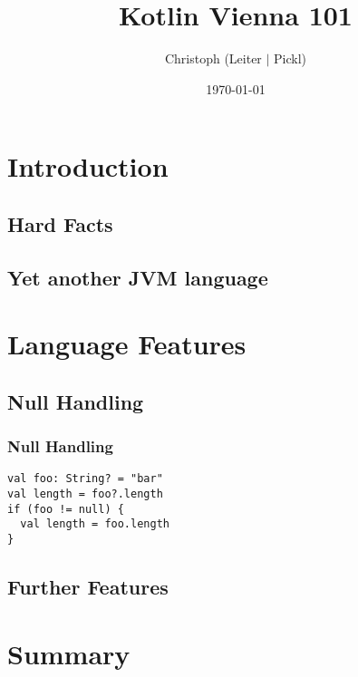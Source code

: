 \documentclass{beamer}
\begin{document}
\title{Kotlin Vienna 101}   
\author{Christoph (Leiter $\vert$ Pickl)} 
\date{\today} 


\frame{\titlepage} 



\section{Introduction}

\subsection{Hard Facts}

\subsection{Yet another JVM language}



\section{Language Features}
\subsection{Null Handling}
\begin{frame}[fragile]
	\frametitle{Null Handling}
\begin{lstlisting}
val foo: String? = "bar"
val length = foo?.length
if (foo != null) {
  val length = foo.length
}
\end{lstlisting}
\end{frame}


\subsection{Further Features}

\section{Summary}
\end{document}
